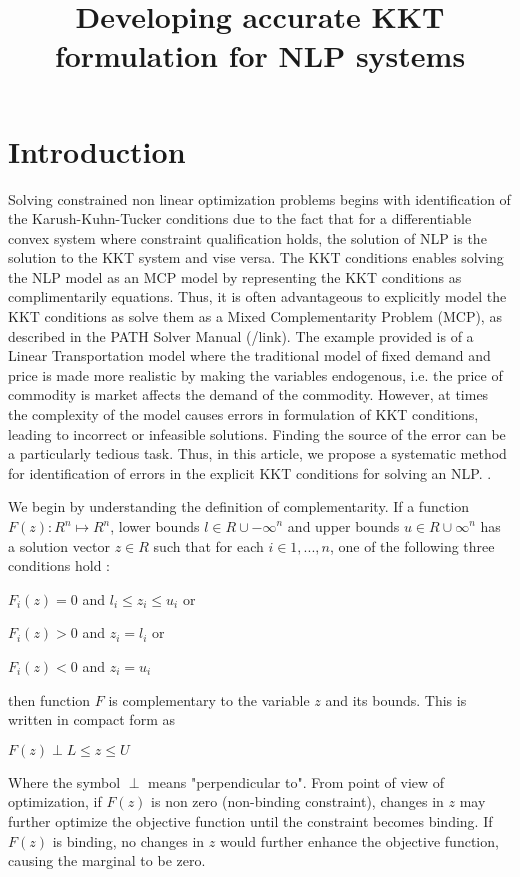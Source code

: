 \documentclass{article}
\title{Developing accurate KKT formulation for NLP systems}
\begin{document}
\section{Introduction}
Solving constrained non linear optimization problems begins with identification of the Karush-Kuhn-Tucker conditions due to the fact that for a differentiable convex system where constraint qualification holds, the solution of NLP is the solution to the KKT system and vise versa. The KKT conditions enables solving the NLP model as an MCP model by representing the KKT conditions as complimentarily equations.  Thus, it is often advantageous to explicitly model the KKT conditions as solve them as a Mixed Complementarity Problem (MCP), as described in the PATH Solver Manual (/link). The example provided is of a Linear Transportation model where the traditional model of fixed demand and price is made more realistic by making the variables endogenous, i.e. the price of commodity is market affects the demand of the commodity.  However, at times the complexity of the model causes errors in formulation of KKT conditions, leading to incorrect or infeasible solutions. Finding the source of the error can be a particularly tedious task. Thus, in this article, we propose a systematic method for identification of errors in the explicit KKT conditions for solving an NLP. .

We begin by understanding the definition of complementarity. If a function $F(z) : {\!R}^n \mapsto {\!R}^n$, lower bounds $ l \in { \!R \cup {-\infty}}^n$ and upper bounds $ u \in { \!R \cup {\infty}}^n$ has a solution vector $z \in \!R$ such that for each $ i \in {1,...,n}$, one of the following three conditions hold :

 \centerline{$F_{i}(z) = 0$  and  $ l_i \leq z_i \leq u_i $   or}
 \centerline{$F_{i}(z) > 0$  and  $ z_i = l_i$  or }
 \centerline{ $F_{i}(z) < 0$  and  $ z_i = u_i$ }

then function $F$ is complementary to the variable $z$ and its bounds. This is written in compact form as

\centerline{ $ F(z) \perp L \leq z \leq U $ }
\par
\noindent Where the symbol $\perp$ means "perpendicular to".  From point of view of optimization, if $F(z)$ is non zero (non-binding constraint), changes in $z$ may further optimize the objective function until the constraint becomes binding. If $F(z)$ is binding, no changes in $z$ would further enhance the objective function, causing the marginal to be zero.
\end{document}
